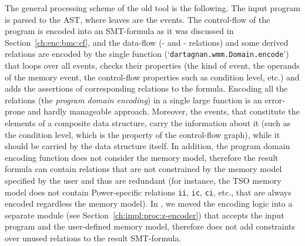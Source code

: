 The general processing scheme of the old tool \porthos[1] is the following.
The input program is parsed to the AST, where leaves are the events.
The control-flow of the program is encoded into an SMT-formula as it was discussed in Section~\ref{ch:enc:bmc:cf}, and the data-flow (\po{}- and \rf{}- relations) and some derived relations are encoded by the single function (`\texttt{dartagnan.wmm.Domain.encode}') that loops over all events, checks their properties (the kind of event, the operands of the memory event, the control-flow properties such as condition level, etc.) and adds the assertions of corresponding relations to the formula.
Encoding all the relations (the \textit{program domain encoding}) in a single large function is an error-prone and hardly manageable approach.
Moreover, the events, that constitute the elements of a composite data structure, carry the information about it (such as the condition level, which is the property of the control-flow graph), while it should be carried by the data structure itself.
In addition, the program domain encoding function does not consider the memory model, therefore the result formula can contain relations that are not constrained by the memory model specified by the user and thus are redundant (for instance, the TSO memory model does not contain Power-specific relations \texttt{ii}, \texttt{ic}, \texttt{ci}, etc., that are always encoded regardless the memory model).
In \porthos[2], we moved the encoding logic into a separate module (see Section~\ref{ch:impl:proc:z-encoder}) that accepts the input program and the user-defined memory model, therefore does not add constraints over unused relations to the result SMT-formula.

